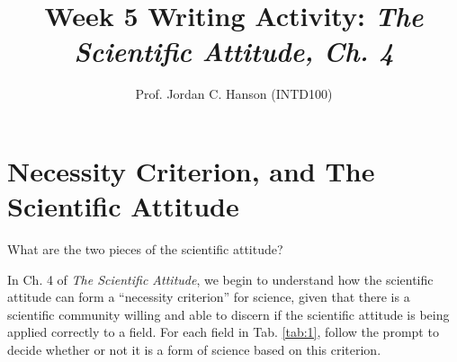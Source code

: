 \documentclass{article}
\begin{document}
\title{Week 5 Writing Activity: \textit{The Scientific Attitude, Ch. 4}}
\author{Prof. Jordan C. Hanson (INTD100)}

\maketitle

\section{Necessity Criterion, and The Scientific Attitude}

What are the two pieces of the scientific attitude? \\ \vspace{2cm}

In Ch. 4 of \textit{The Scientific Attitude}, we begin to understand how the scientific attitude can form a ``necessity criterion'' for science, given that there is a scientific community willing and able to discern if the scientific attitude is being applied correctly to a field.  For each field in Tab. \ref{tab:1}, follow the prompt to decide whether or not it is a form of science based on this criterion.
\end{document}
